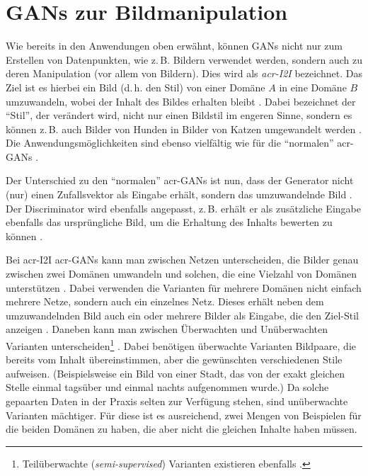 \section{GANs zur Bildmanipulation}

Wie bereits in den Anwendungen oben erwähnt, können GANs nicht nur zum Erstellen
von Datenpunkten, wie z.\,B. Bildern verwendet werden, sondern auch zu deren
Manipulation (vor allem von Bildern). Dies wird als \emph{\gls{acr-I2I}}
bezeichnet. Das Ziel ist es hierbei ein Bild (d.\,h. den Stil) von einer Domäne
$A$ in eine Domäne $B$ umzuwandeln, wobei der Inhalt des Bildes erhalten bleibt
\cite{pang2021image}. Dabei bezeichnet der \enquote{Stil}, der verändert wird,
nicht nur einen Bildstil im engeren Sinne, sondern es können z.\,B. auch Bilder
von Hunden in Bilder von Katzen umgewandelt werden \cite{liu2019few}.
Die Anwendungsmöglichkeiten sind ebenso vielfältig wie für die \enquote{normalen}
\gls{acr-GAN}s \cite[vgl.][S. 1]{pang2021image}.

Der Unterschied zu den \enquote{normalen} \gls{acr-GAN}s ist nun, dass der Generator
nicht (nur) einen Zufallsvektor als Eingabe erhält, sondern das umzuwandelnde
Bild \cite{pang2021image}. Der Discriminator wird ebenfalls angepasst, z.\,B. erhält er als
zusätzliche Eingabe ebenfalls das ursprüngliche Bild, um die Erhaltung des
Inhalts bewerten zu können \cite{isola2017image}.

Bei \gls{acr-I2I} \gls{acr-GAN}s kann man zwischen Netzen unterscheiden, die
Bilder genau zwischen zwei Domänen umwandeln \cite{isola2017image,
zhu2017unpaired, ledig2017photo, demir2018patch} und solchen, die eine Vielzahl von
Domänen unterstützen
\cite{liu2019few,huang2017arbitrary,saito2020coco,anokhin2020high}. Dabei
verwenden die Varianten für mehrere Domänen nicht einfach mehrere Netze, sondern
auch ein einzelnes
Netz. Dieses erhält neben dem umzuwandelnden Bild auch ein oder mehrere Bilder
als Eingabe, die den Ziel-Stil anzeigen \cites{pang2021image}{liu2019few}.
Daneben kann man zwischen Überwachten \cite{isola2017image,ledig2017photo,demir2018patch} und Unüberwachten
\cite{liu2019few,zhu2017unpaired,huang2017arbitrary,saito2020coco,anokhin2020high,}
Varianten unterscheiden\footnote{Teilüberwachte (\emph{semi-supervised})
Varianten existieren ebenfalls \cite{pang2021image}.}  \cite[vgl.][S. 5,
11]{pang2021image}.
Dabei benötigen
überwachte Varianten Bildpaare, die bereits vom Inhalt übereinstimmen, aber die
gewünschten verschiedenen Stile aufweisen. (Beispielsweise ein Bild von einer Stadt, das
von der exakt gleichen Stelle einmal tagsüber und einmal nachts aufgenommen
wurde.) Da solche gepaarten Daten in der Praxis selten zur Verfügung stehen,
sind unüberwachte Varianten mächtiger. Für diese ist es ausreichend, zwei Mengen
von Beispielen für die beiden Domänen zu haben, die aber nicht die gleichen
Inhalte haben müssen.